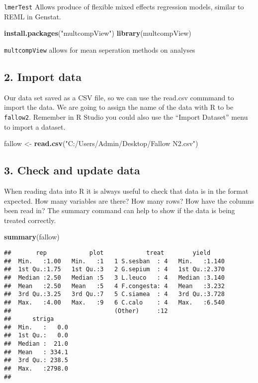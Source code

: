 \documentclass[]{book}
\newenvironment{Shaded}{\begin{snugshade}}{\end{snugshade}}
\newcommand{\KeywordTok}[1]{\textcolor[rgb]{0.13,0.29,0.53}{\textbf{#1}}}
\newcommand{\StringTok}[1]{\textcolor[rgb]{0.31,0.60,0.02}{#1}}
\newcommand{\NormalTok}[1]{#1}
\theoremstyle{definition}
\theoremstyle{definition}
\theoremstyle{definition}
\theoremstyle{remark}
\begin{document}
\texttt{lmerTest} Allows produce of flexible mixed effects regression
models, similar to REML in Genstat.

\begin{Shaded}
\begin{Highlighting}[]
\KeywordTok{install.packages}\NormalTok{(}\StringTok{"multcompView"}\NormalTok{)}
\KeywordTok{library}\NormalTok{(multcompView)}
\end{Highlighting}
\end{Shaded}

\texttt{multcompView} allows for mean seperation methods on analyses

\subsection{2. Import data}\label{import-data}

Our data set saved as a CSV file, so we can use the read.csv commmand to
import the data. We are going to assign the name of the data with R to
be \texttt{fallow2}. Remember in R Studio you could also use the
``Import Dataset'' menu to import a dataset.

\begin{Shaded}
\begin{Highlighting}[]
\NormalTok{fallow <-}\StringTok{ }\KeywordTok{read.csv}\NormalTok{(}\StringTok{"C:/Users/Admin/Desktop/Fallow N2.csv"}\NormalTok{)}
\end{Highlighting}
\end{Shaded}

\subsection{3. Check and update data}\label{check-and-update-data}

When reading data into R it is always useful to check that data is in
the format expected. How many variables are there? How many rows? How
have the columns been read in? The summary command can help to show if
the data is being treated correctly.

\begin{Shaded}
\begin{Highlighting}[]
\KeywordTok{summary}\NormalTok{(fallow)}
\end{Highlighting}
\end{Shaded}

\begin{verbatim}
##       rep            plot            treat        yield      
##  Min.   :1.00   Min.   :1   1 S.sesban  : 4   Min.   :1.140  
##  1st Qu.:1.75   1st Qu.:3   2 G.sepium  : 4   1st Qu.:2.370  
##  Median :2.50   Median :5   3 L.leuco   : 4   Median :3.140  
##  Mean   :2.50   Mean   :5   4 F.congesta: 4   Mean   :3.232  
##  3rd Qu.:3.25   3rd Qu.:7   5 C.siamea  : 4   3rd Qu.:3.728  
##  Max.   :4.00   Max.   :9   6 C.calo    : 4   Max.   :6.540  
##                             (Other)     :12                  
##      striga      
##  Min.   :   0.0  
##  1st Qu.:   0.0  
##  Median :  21.0  
##  Mean   : 334.1  
##  3rd Qu.: 238.5  
##  Max.   :2798.0  
## 
\end{verbatim}
\end{document}
